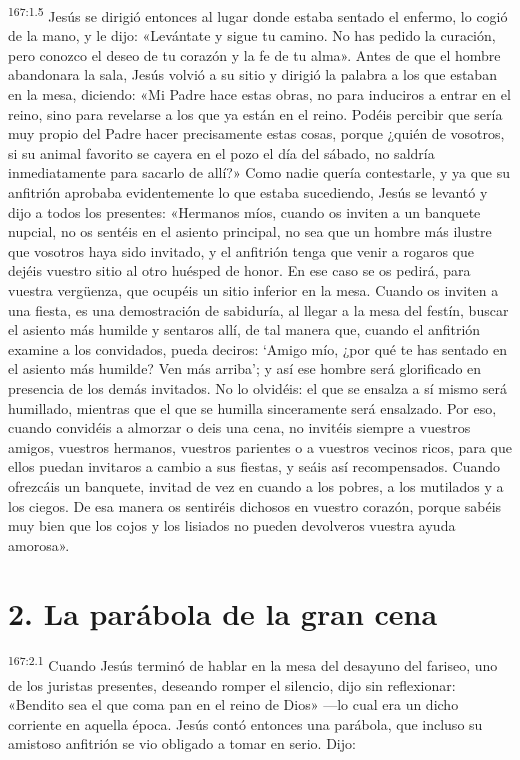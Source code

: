 \par 
\textsuperscript{167:1.5} Jesús se dirigió entonces al lugar donde estaba sentado el enfermo, lo cogió de la mano, y le dijo: «Levántate y sigue tu camino. No has pedido la curación, pero conozco el deseo de tu corazón y la fe de tu alma». Antes de que el hombre abandonara la sala, Jesús volvió a su sitio y dirigió la palabra a los que estaban en la mesa, diciendo: «Mi Padre hace estas obras, no para induciros a entrar en el reino, sino para revelarse a los que ya están en el reino. Podéis percibir que sería muy propio del Padre hacer precisamente estas cosas, porque ¿quién de vosotros, si su animal favorito se cayera en el pozo el día del sábado, no saldría inmediatamente para sacarlo de allí?» Como nadie quería contestarle, y ya que su anfitrión aprobaba evidentemente lo que estaba sucediendo, Jesús se levantó y dijo a todos los presentes: «Hermanos míos, cuando os inviten a un banquete nupcial, no os sentéis en el asiento principal, no sea que un hombre más ilustre que vosotros haya sido invitado, y el anfitrión tenga que venir a rogaros que dejéis vuestro sitio al otro huésped de honor. En ese caso se os pedirá, para vuestra verg\"uenza, que ocupéis un sitio inferior en la mesa. Cuando os inviten a una fiesta, es una demostración de sabiduría, al llegar a la mesa del festín, buscar el asiento más humilde y sentaros allí, de tal manera que, cuando el anfitrión examine a los convidados, pueda deciros: `Amigo mío, ¿por qué te has sentado en el asiento más humilde? Ven más arriba'; y así ese hombre será glorificado en presencia de los demás invitados. No lo olvidéis: el que se ensalza a sí mismo será humillado, mientras que el que se humilla sinceramente será ensalzado. Por eso, cuando convidéis a almorzar o deis una cena, no invitéis siempre a vuestros amigos, vuestros hermanos, vuestros parientes o a vuestros vecinos ricos, para que ellos puedan invitaros a cambio a sus fiestas, y seáis así recompensados. Cuando ofrezcáis un banquete, invitad de vez en cuando a los pobres, a los mutilados y a los ciegos. De esa manera os sentiréis dichosos en vuestro corazón, porque sabéis muy bien que los cojos y los lisiados no pueden devolveros vuestra ayuda amorosa».

\section*{2. La parábola de la gran cena}
\par 
\textsuperscript{167:2.1} Cuando Jesús terminó de hablar en la mesa del desayuno del fariseo, uno de los juristas presentes, deseando romper el silencio, dijo sin reflexionar: «Bendito sea el que coma pan en el reino de Dios» ---lo cual era un dicho corriente en aquella época. Jesús contó entonces una parábola, que incluso su amistoso anfitrión se vio obligado a tomar en serio. Dijo:

